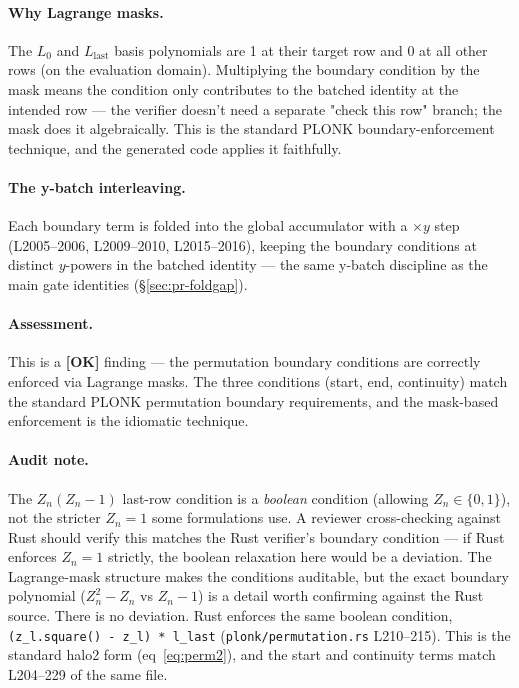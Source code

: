\paragraph{Why Lagrange masks.} The $L_0$ and $L_{\text{last}}$
basis polynomials are 1 at their target row and 0 at all other
rows (on the evaluation domain). Multiplying the boundary
condition by the mask means the condition only contributes to the
batched identity at the intended row --- the verifier doesn't
need a separate "check this row" branch; the mask does it
algebraically. This is the standard PLONK boundary-enforcement
technique, and the generated code applies it faithfully.

\paragraph{The y-batch interleaving.} Each boundary term is
folded into the global accumulator with a $\times y$ step
(L2005--2006, L2009--2010, L2015--2016), keeping the boundary
conditions at distinct $y$-powers in the batched identity --- the
same y-batch discipline as the main gate identities
(§\ref{sec:pr-foldgap}).

\paragraph{Assessment.} This is a
\textcolor{tracegreen}{\textbf{[OK]}} finding --- the
permutation boundary conditions are correctly enforced via
Lagrange masks. The three conditions (start, end, continuity)
match the standard PLONK permutation boundary requirements, and
the mask-based enforcement is the idiomatic technique.

\paragraph{Audit note.} The $Z_n(Z_n - 1)$ last-row condition is
a \emph{boolean} condition (allowing $Z_n \in \{0, 1\}$), not
the stricter $Z_n = 1$ some formulations use. A reviewer
cross-checking against Rust should verify this matches the Rust
verifier's boundary condition --- if Rust enforces $Z_n = 1$
strictly, the boolean relaxation here would be a deviation. The
Lagrange-mask structure makes the conditions auditable, but the
exact boundary polynomial ($Z_n^2 - Z_n$ vs $Z_n - 1$) is a
detail worth confirming against the Rust source.
 There is no deviation. Rust enforces the same
boolean condition,
\texttt{(z\_\allowbreak{}l.square() - z\_\allowbreak{}l) * l\_\allowbreak{}last}
(\texttt{plonk/\allowbreak{}permutation.rs} L210--215). This is the standard halo2
form (eq~\eqref{eq:perm2}), and the start and continuity terms match
L204--229 of the same file.

